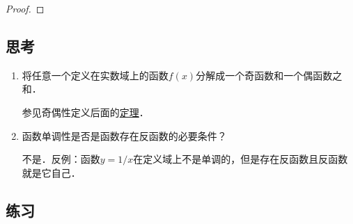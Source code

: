 \begin{example*}
\begin{proof}
  \end{proof}
\end{example*}

\subsection*{思考}

\begin{enumerate}
\item 将任意一个定义在实数域上的函数\(f(x)\)分解成一个奇函数和一个偶函数之和．

  \ifshowsolp
  参见奇偶性定义后面的\hyperlink{T:evenodd}{定理}．
  \fi

\item 函数单调性是否是函数存在反函数的必要条件？

  \ifshowsolp
  不是．反例：函数\(y = 1/x\)在定义域上不是单调的，但是存在反函数且反函数就是它自己．
  \fi
\end{enumerate}

\ifshowex
{}
\subsection*{练习}

